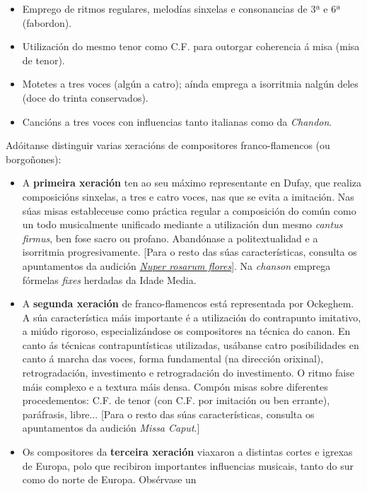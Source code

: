 \documentclass[
]{article}
\begin{document}
\begin{itemize}
\item
  Emprego de ritmos regulares, melodías sinxelas e consonancias de 3ª e
  6ª (fabordon).
\item
  Utilización do mesmo tenor como C.F. para outorgar coherencia á misa
  (misa de tenor).
\item
  Motetes a tres voces (algún a catro); aínda emprega a isorritmia
  nalgún deles (doce do trinta conservados).
\item
  Cancións a tres voces con influencias tanto italianas como da
  \emph{Chandon}.
\end{itemize}

Adóitanse distinguir varias xeracións de compositores franco-flamencos
(ou borgoñones):

\begin{itemize}
\item
  A \textbf{primeira xeración} ten ao seu máximo representante en Dufay,
  que realiza composicións sinxelas, a tres e catro voces, nas que se
  evita a imitación. Nas súas misas estableceuse como práctica regular a
  composición do común como un todo musicalmente unificado mediante a
  utilización dun mesmo \emph{cantus firmus}, ben fose sacro ou profano.
  Abandónase a politextualidad e a isorritmia progresivamente. {[}Para o
  resto das súas características, consulta os apuntamentos da audición
  \href{http://es.wikipedia.org/wiki/Nuper_Rosarum_Flores}{\emph{Nuper
  rosarum flores}}{]}. Na \emph{chanson} emprega fórmelas \emph{fixes}
  herdadas da Idade Media.
\item
  A \textbf{segunda xeración} de franco-flamencos está representada por
  Ockeghem. A súa característica máis importante é a utilización do
  contrapunto imitativo, a miúdo rigoroso, especializándose os
  compositores na técnica do canon. En canto ás técnicas
  contrapuntísticas utilizadas, usábanse catro posibilidades en canto á
  marcha das voces, forma fundamental (na dirección orixinal),
  retrogradación, investimento e retrogradación do investimento. O ritmo
  faise máis complexo e a textura máis densa. Compón misas sobre
  diferentes procedementos: C.F. de tenor (con C.F. por imitación ou ben
  errante), paráfrasis, libre... {[}Para o resto das súas
  características, consulta os apuntamentos da audición \emph{Missa
  Caput}.{]}
\item
  Os compositores da \textbf{terceira xeración} viaxaron a distintas
  cortes e igrexas de Europa, polo que recibiron importantes influencias
  musicais, tanto do sur como do norte de Europa. Obsérvase un

\end{itemize}
\end{document}
